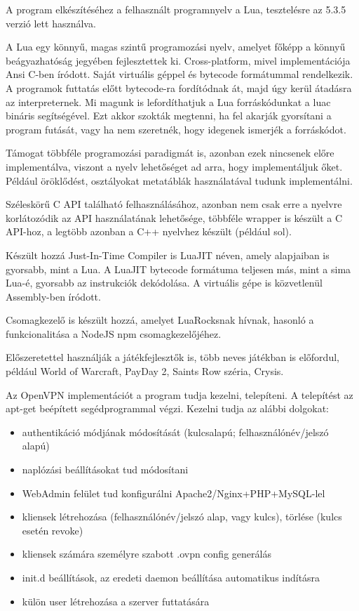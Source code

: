 
A program elkészítéséhez a felhasznált programnyelv a Lua, tesztelésre az 5.3.5 verzió lett használva.

A Lua egy könnyű, magas szintű programozási nyelv, amelyet főképp a könnyű beágyazhatóság jegyében fejlesztettek ki. Cross-platform, mivel implementációja Ansi C-ben íródott. Saját virtuális géppel és bytecode formátummal rendelkezik.
A programok futtatás előtt bytecode-ra fordítódnak át, majd úgy kerül átadásra az interpreternek. Mi magunk is lefordíthatjuk a Lua forráskódunkat a luac bináris segítségével.
Ezt akkor szokták megtenni, ha fel akarják gyorsítani a program futását, vagy ha nem szeretnék, hogy idegenek ismerjék a forráskódot.

Támogat többféle programozási paradigmát is, azonban ezek nincsenek előre implementálva, viszont a nyelv lehetőséget ad arra, hogy implementáljuk őket. Például öröklődést, osztályokat metatáblák használatával tudunk implementálni. \cite{ooplua}

Széleskörű C API található felhasználásához, azonban nem csak erre a nyelvre korlátozódik az API használatának lehetősége, többféle wrapper is készült a C API-hoz, a legtöbb azonban a C++ nyelvhez készült (például sol).

Készült hozzá Just-In-Time Compiler is LuaJIT néven, amely alapjaiban is gyorsabb, mint a Lua. A LuaJIT bytecode formátuma teljesen más, mint a sima Lua-é, gyorsabb az instrukciók dekódolása. A virtuális gépe is közvetlenül Assembly-ben íródott. \cite {luajit}

Csomagkezelő is készült hozzá, amelyet LuaRocksnak hívnak, hasonló a funkcionalitása a NodeJS npm csomagkezelőjéhez.

Előszeretettel használják a játékfejlesztők is, több neves játékban is előfordul, például World of Warcraft, PayDay 2, Saints Row széria, Crysis. \cite{usageoflua}


Az OpenVPN implementációt a program tudja kezelni, telepíteni. A telepítést az apt-get beépített segédprogrammal végzi. Kezelni tudja az alábbi dolgokat:
\begin{itemize}
 \item authentikáció módjának módosítását (kulcsalapú; felhasználónév/jelszó alapú)
 \item naplózási beállításokat tud módosítani
 \item WebAdmin felület tud konfigurálni Apache2/Nginx+PHP+MySQL-lel
 \item kliensek létrehozása (felhasználónév/jelszó alap, vagy kulcs), törlése (kulcs esetén revoke)
 \item kliensek számára személyre szabott .ovpn config generálás
 \item init.d beállítások, az eredeti daemon beállítása automatikus indításra
 \item külön user létrehozása a szerver futtatására
\end{itemize}

